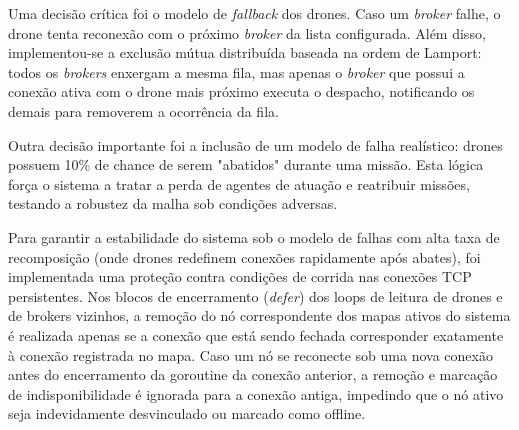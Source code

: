 Uma decisão crítica foi o modelo de \textit{fallback} dos drones. Caso um \textit{broker} falhe, o drone tenta reconexão com o próximo \textit{broker} da lista configurada. Além disso, implementou-se a exclusão mútua distribuída baseada na ordem de Lamport: todos os \textit{brokers} enxergam a mesma fila, mas apenas o \textit{broker} que possui a conexão ativa com o drone mais próximo executa o despacho, notificando os demais para removerem a ocorrência da fila.

Outra decisão importante foi a inclusão de um modelo de falha realístico: drones possuem 10\% de chance de serem "abatidos" durante uma missão. Esta lógica força o sistema a tratar a perda de agentes de atuação e reatribuir missões, testando a robustez da malha sob condições adversas.

Para garantir a estabilidade do sistema sob o modelo de falhas com alta taxa de recomposição (onde drones redefinem conexões rapidamente após abates), foi implementada uma proteção contra condições de corrida nas conexões TCP persistentes. Nos blocos de encerramento (\textit{defer}) dos loops de leitura de drones e de brokers vizinhos, a remoção do nó correspondente dos mapas ativos do sistema é realizada apenas se a conexão que está sendo fechada corresponder exatamente à conexão registrada no mapa. Caso um nó se reconecte sob uma nova conexão antes do encerramento da goroutine da conexão anterior, a remoção e marcação de indisponibilidade é ignorada para a conexão antiga, impedindo que o nó ativo seja indevidamente desvinculado ou marcado como offline.

